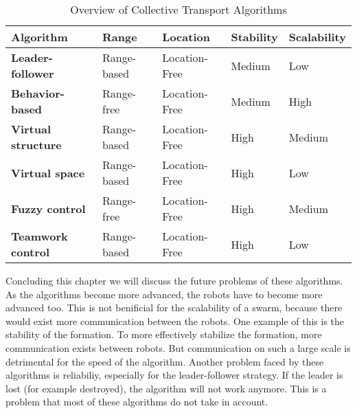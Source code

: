   \begin{table}[H]
  \renewcommand{\arraystretch}{1.3}
  \label{table_alg_coltrans2}
  \caption{Overview of Collective Transport Algorithms}
  \centering
  \begin{tabular}{|p{5cm}|l|l|l|l|}
    \hline
    \bfseries Algorithm & \bfseries Range & Location & \bfseries Stability & \bfseries Scalability\\
    \hline
    \bfseries Leader-follower & Range-based & Location-Free & Medium & Low\\\hline
    \bfseries Behavior-based & Range-free & Location-Free & Medium & High\\\hline
    \bfseries Virtual structure& Range-based& Location-Free & High  & Medium\\\hline
    \bfseries Virtual space & Range-based& Location-Free & High  & Low\\\hline
    \bfseries Fuzzy control& Range-free& Location-Free & High  & Medium\\\hline
    \bfseries Teamwork control& Range-based& Location-Free & High  & Low\\\hline

    \end{tabular}
  \end{table}

Concluding this chapter we will discuss the future problems of these algorithms. 
As the algorithms become more advanced, the robots have to become more advanced too.
This is not benificial for the scalability of a swarm, because there would exist more communication between the robots. 
One example of this is the stability of the formation. 
To more effectively stabilize the formation, more communication exists between robots. 
But communication on such a large scale is detrimental for the speed of the algorithm. 
Another problem faced by these algorithms is reliabiliy, especially for the leader-follower strategy. 
If the leader is lost (for example destroyed), the algorithm will not work anymore. 
This is a problem that most of these algorithms do not take in account.  

